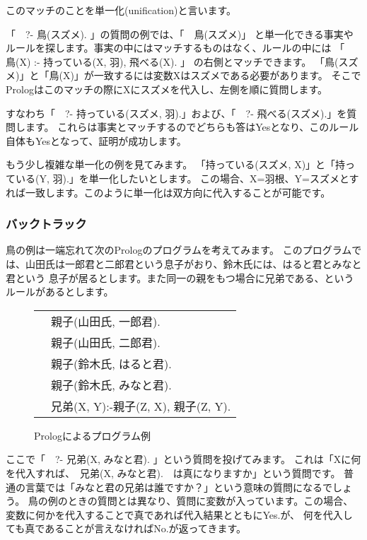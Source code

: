 \documentclass[a4j,dvipdfmx]{jsarticle}
\newcommand{\fixed}[1]{{\ttfamily #1}}
\begin{document}
このマッチのことを単一化(unification)と言います。

「{\fixed 　?- 鳥(スズメ). } 」の質問の例では、「{\fixed 　鳥(スズメ)}」
と単一化できる事実やルールを探します。事実の中にはマッチするものはなく、ルールの中には
「 {\fixed　鳥(X) :- 持っている(X, 羽), 飛べる(X). } 」
 の右側とマッチできます。
「{\fixed 鳥(スズメ)}」と「{\fixed 鳥(X)}」が一致するには変数Xはスズメである必要があります。
そこでPrologはこのマッチの際にXにスズメを代入し、左側を順に質問します。

すなわち「{\fixed 　?- 持っている(スズメ, 羽).}」および、「{\fixed 　?-  飛べる(スズメ).}」を質問します。
これらは事実とマッチするのでどちらも答はYesとなり、このルール自体もYesとなって、証明が成功します。

もう少し複雑な単一化の例を見てみます。
「{\fixed 持っている(スズメ, X)}」と「{\fixed 持っている(Y, 羽).}」を単一化したいとします。
この場合、X=羽根、Y=スズメとすれば一致します。このように単一化は双方向に代入することが可能です。

\subsubsection{バックトラック}
鳥の例は一端忘れて次のPrologのプログラムを考えてみます。
このプログラムでは、山田氏は一郎君と二郎君という息子がおり、鈴木氏には、はると君とみなと君という
息子が居るとします。また同一の親をもつ場合に兄弟である、というルールがあるとします。

\begin{figure}[htbp]
\centering
\begin{tabular}{l}
{\fixed 　親子(山田氏, 一郎君). } \\
{\fixed 　親子(山田氏, 二郎君). } \\
{\fixed 　親子(鈴木氏, はると君). } \\
{\fixed 　親子(鈴木氏, みなと君). } \\
{\fixed 　兄弟(X, Y):-親子(Z, X), 親子(Z, Y). } \\
\end{tabular}
\caption{Prologによるプログラム例}
\label{fig:program}
\end{figure}

ここで「{\fixed 　?- 兄弟(X, みなと君). } 」という質問を投げてみます。
これは「Xに何を代入すれば、{\fixed　兄弟(X, みなと君).　}は真になりますか」という質問です。
普通の言葉では「みなと君の兄弟は誰ですか？」という意味の質問になるでしょう。
鳥の例のときの質問とは異なり、質問に変数が入っています。この場合、
変数に何かを代入することで真であれば代入結果とともにYes.が、
何を代入しても真であることが言えなければNo.が返ってきます。
\end{document}
